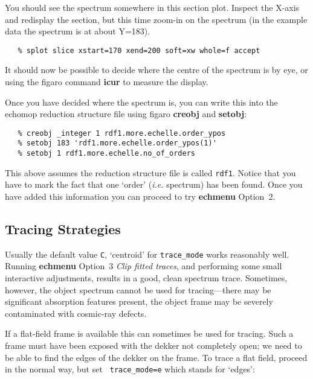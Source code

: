 \documentclass[twoside,11pt]{article}
\newcommand{\htmlref}[2]{#1}
\newcommand{\xref}[3]{#1}
\newcommand{\xlabel}[1]{}
\newcommand{\mlabel}[1]{\xlabel{#1}\label{#1}}
\newcommand{\scspec}[2]{#1}
\newcommand{\scspec}[2]{#2}
\begin{document}
You should see the spectrum somewhere in this section plot.  Inspect the
X-axis and redisplay the section, but this time zoom-in on the spectrum
(in the example data the spectrum is at about Y=183).

{
\scspec{\small}{ }
\begin{verbatim}
   % splot slice xstart=170 xend=200 soft=xw whole=f accept
\end{verbatim}
}

It should now be possible to decide where the centre of the spectrum is
by eye, or using the {\sc figaro} command \xref{{\bf icur}}{sun86}{ICUR}
to measure the display.

Once you have decided where the spectrum is, you can write this into the
{\sc echomop}
\xref{reduction structure file}{sun152}{reduction_file} using {\sc figaro}
\xref{{\bf creobj}}{sun86}{CREOBJ} and
\xref{{\bf setobj}}{sun86}{SETOBJ}:

{
\scspec{\small}{ }
\begin{verbatim}
   % creobj _integer 1 rdf1.more.echelle.order_ypos
   % setobj 183 'rdf1.more.echelle.order_ypos(1)'
   % setobj 1 rdf1.more.echelle.no_of_orders
\end{verbatim}
}

This above assumes the reduction structure file is called \verb+rdf1+\@.
Notice that you have to mark the fact that one `order' ({\it{i.e.}} spectrum)
has been found.  Once you have added this information you can proceed to
try \xref{{\bf echmenu} Option~2}{sun152}{option2}\@.


\subsection{\mlabel{cook_tracing}Tracing Strategies}

Usually the default value {\tt C}, `centroid' for
\xref{{\tt trace\_mode}}{sun152}{par_TRACE_MODE} works reasonably
well. Running \xref{{\bf echmenu}}{sun152}{ECHMENU} \xref{Option~3
{\sl Clip fitted traces}}{sun152}{option3}, and performing some small
interactive adjustments, results in a good, clean spectrum trace.
Sometimes, however, the object spectrum cannot be used for
tracing\scspec{---}{ - }there may be significant absorption features
present, the object frame may be severely contaminated with cosmic-ray
defects.

If a flat-field frame is available this can sometimes be used for tracing.
Such a frame must have been exposed with the \htmlref{dekker}{gl_dekker}
not completely open;
we need to be able to find the edges of the dekker on the frame.
To trace a flat field, proceed in the normal way, but set \xref{{\tt
trace\_mode=e}}{sun152}{par_TRACE_MODE} which stands for `edges':
\end{document}
